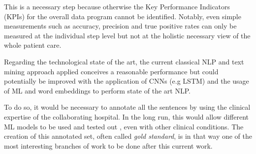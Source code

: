 This is a necessary step because otherwise the Key Performance Indicators (KPIs) for the overall data program cannot be identified. Notably, even simple measurements such as accuracy, precision and true positive rates can only be measured at the individual step level but not at the holistic necessary view of the whole patient care.

Regarding the technological state of the art, the current classical NLP and text mining approach applied conceives a reasonable performance but could potentially be improved with the application of CNNs (e.g LSTM) and the usage of ML and word embeddings to perform state of the art NLP.

To do so, it would be necessary to annotate all the sentences by using the clinical expertise of the collaborating hospital. In the long run, this would allow different ML models to be used and tested out , even with other clinical conditions. The creation of this annotated set, often called \emph{gold standard}, is in that way one of the most interesting branches of work to be done after this current work.
